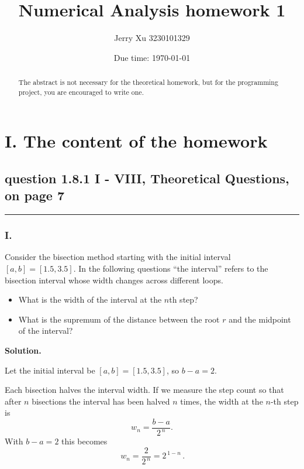\documentclass[a4paper]{article}
\begin{document}
\title{Numerical Analysis homework 1}

\author[1]{Jerry Xu 3230101329}


\date{Due time: \today}

\maketitle

\begin{abstract}
    The abstract is not necessary for the theoretical homework, 
    but for the programming project, 
    you are encouraged to write one.      
\end{abstract}





\section*{I. The content of the homework}

\subsection*{question 1.8.1 I - VIII,  Theoretical Questions, on page 7}
\noindent\rule{\textwidth}{.4pt}

\subsubsection*{I.}
Consider the bisection method starting with the initial interval $[a, b] = [1.5, 3.5]$. In the following questions ``the interval'' refers to the bisection interval whose width changes across different loops.
    \begin{itemize}
        \item What is the width of the interval at the $n$th step?
        \item What is the supremum of the distance between the root $r$ and the midpoint of the interval?
    \end{itemize}

\textbf{Solution.}

Let the initial interval be $[a,b]=[1.5,3.5]$, so $b-a=2$.


Each bisection halves the interval width. If we measure the step count so that after $n$ bisections the interval has been halved $n$ times, the width at the $n$-th step is
\[
w_n=\frac{b-a}{2^{\,n}}.
\]
With $b-a=2$ this becomes
\[
\boxed{\,w_n=\frac{2}{2^{\,n}}=2^{\,1-n}\,.}
\]
\end{document}
